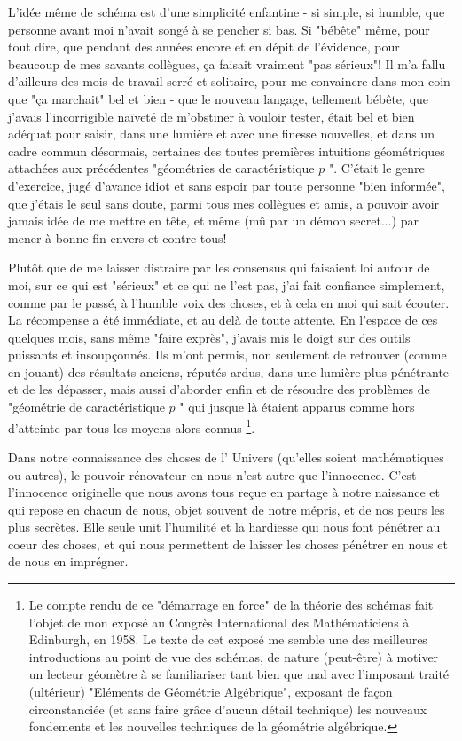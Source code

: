 L'idée même de schéma est d'une simplicité enfantine - si simple, si humble, que personne avant moi n'avait songé à se pencher si bas. Si "bébête" même, pour tout dire, que pendant des années encore et en dépit de l'évidence, pour beaucoup de mes savants collègues, ça faisait vraiment "pas sérieux"! Il m'a fallu d'ailleurs des mois de travail serré et solitaire, pour me convaincre dans mon coin que "ça marchait" bel et bien - que le nouveau langage, tellement bébête, que j'avais l'incorrigible naïveté de m'obstiner à vouloir tester, était bel et bien adéquat pour saisir, dans une lumière et avec une finesse nouvelles, et dans un cadre commun désormais, certaines des toutes premières intuitions géométriques attachées aux précédentes "géométries de caractéristique $p$ ". C'était le genre d'exercice, jugé d'avance idiot et sans espoir par toute personne "bien informée", que j'étais le seul sans doute, parmi tous mes collègues et amis, a pouvoir avoir jamais idée de me mettre en tête, et même (mû par un démon secret...) par mener à bonne fin envers et contre tous!

Plutôt que de me laisser distraire par les consensus qui faisaient loi autour de moi, sur ce qui est "sérieux" et ce qui ne l'est pas, j'ai fait confiance simplement, comme par le passé, à l'humble voix des choses, et à cela en moi qui sait écouter. La récompense a été immédiate, et au delà de toute attente. En l'espace de ces quelques mois, sans même "faire exprès", j'avais mis le doigt sur des outils puissants et insoupçonnés. Ils m'ont permis, non seulement de retrouver (comme en jouant) des résultats anciens, réputés ardus, dans une lumière plus pénétrante et de les dépasser, mais aussi d'aborder enfin et de résoudre des problèmes de "géométrie de caractéristique $p$ " qui jusque là étaient apparus comme hors d'atteinte par tous les moyens alors connus \footnote{Le compte rendu de ce "démarrage en force" de la théorie des schémas fait l'objet de mon exposé au Congrès International des Mathématiciens à Edinburgh, en 1958. Le texte de cet exposé me semble une des meilleures introductions au point de vue des schémas, de nature (peut-être) à motiver un lecteur géomètre à se familiariser tant bien que mal avec l'imposant traité (ultérieur) "Eléments de Géométrie Algébrique", exposant de façon circonstanciée (et sans faire grâce d'aucun détail technique) les nouveaux fondements et les nouvelles techniques de la géométrie algébrique.}.

Dans notre connaissance des choses de l' Univers (qu'elles soient mathématiques ou autres), le pouvoir rénovateur en nous n'est autre que l'innocence. C'est l'innocence originelle que nous avons tous reçue en partage à notre naissance et qui repose en chacun de nous, objet souvent de notre mépris, et de nos peurs les plus secrètes. Elle seule unit l'humilité et la hardiesse qui nous font pénétrer au coeur des choses, et qui nous permettent de laisser les choses pénétrer en nous et de nous en imprégner.

